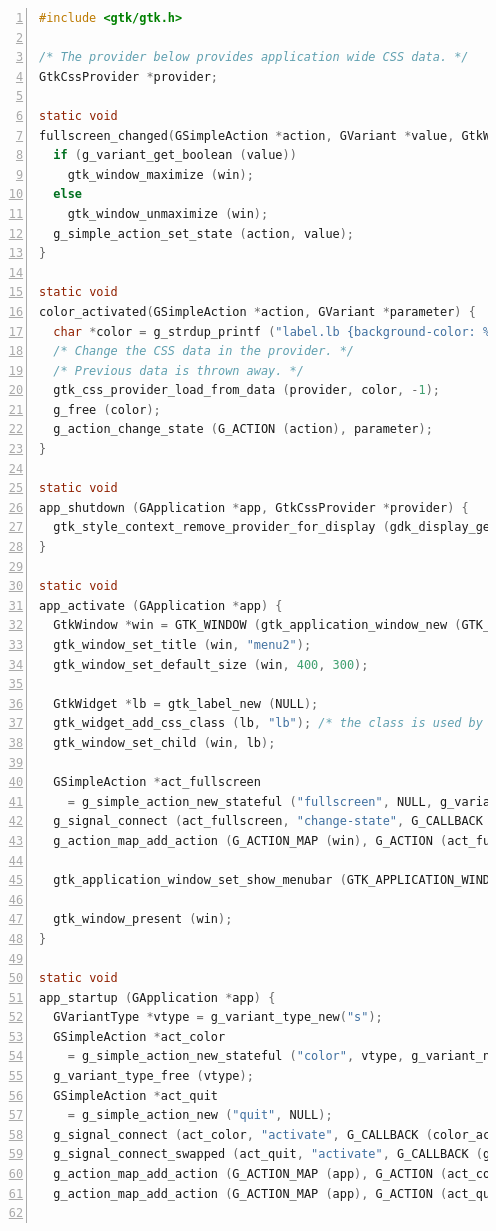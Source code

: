 \begin{lstlisting}[language=C, numbers=left]
#include <gtk/gtk.h>

/* The provider below provides application wide CSS data. */
GtkCssProvider *provider;

static void
fullscreen_changed(GSimpleAction *action, GVariant *value, GtkWindow *win) {
  if (g_variant_get_boolean (value))
    gtk_window_maximize (win);
  else
    gtk_window_unmaximize (win);
  g_simple_action_set_state (action, value);
}

static void
color_activated(GSimpleAction *action, GVariant *parameter) {
  char *color = g_strdup_printf ("label.lb {background-color: %s;}", g_variant_get_string (parameter, NULL));
  /* Change the CSS data in the provider. */
  /* Previous data is thrown away. */
  gtk_css_provider_load_from_data (provider, color, -1);
  g_free (color);
  g_action_change_state (G_ACTION (action), parameter);
}

static void
app_shutdown (GApplication *app, GtkCssProvider *provider) {
  gtk_style_context_remove_provider_for_display (gdk_display_get_default(), GTK_STYLE_PROVIDER (provider));
}

static void
app_activate (GApplication *app) {
  GtkWindow *win = GTK_WINDOW (gtk_application_window_new (GTK_APPLICATION (app)));
  gtk_window_set_title (win, "menu2");
  gtk_window_set_default_size (win, 400, 300);

  GtkWidget *lb = gtk_label_new (NULL);
  gtk_widget_add_css_class (lb, "lb"); /* the class is used by CSS Selector */
  gtk_window_set_child (win, lb);

  GSimpleAction *act_fullscreen
    = g_simple_action_new_stateful ("fullscreen", NULL, g_variant_new_boolean (FALSE));
  g_signal_connect (act_fullscreen, "change-state", G_CALLBACK (fullscreen_changed), win);
  g_action_map_add_action (G_ACTION_MAP (win), G_ACTION (act_fullscreen));

  gtk_application_window_set_show_menubar (GTK_APPLICATION_WINDOW (win), TRUE);

  gtk_window_present (win);
}

static void
app_startup (GApplication *app) {
  GVariantType *vtype = g_variant_type_new("s");
  GSimpleAction *act_color
    = g_simple_action_new_stateful ("color", vtype, g_variant_new_string ("red"));
  g_variant_type_free (vtype);
  GSimpleAction *act_quit
    = g_simple_action_new ("quit", NULL);
  g_signal_connect (act_color, "activate", G_CALLBACK (color_activated), NULL);
  g_signal_connect_swapped (act_quit, "activate", G_CALLBACK (g_application_quit), app);
  g_action_map_add_action (G_ACTION_MAP (app), G_ACTION (act_color));
  g_action_map_add_action (G_ACTION_MAP (app), G_ACTION (act_quit));


\end{lstlisting}

